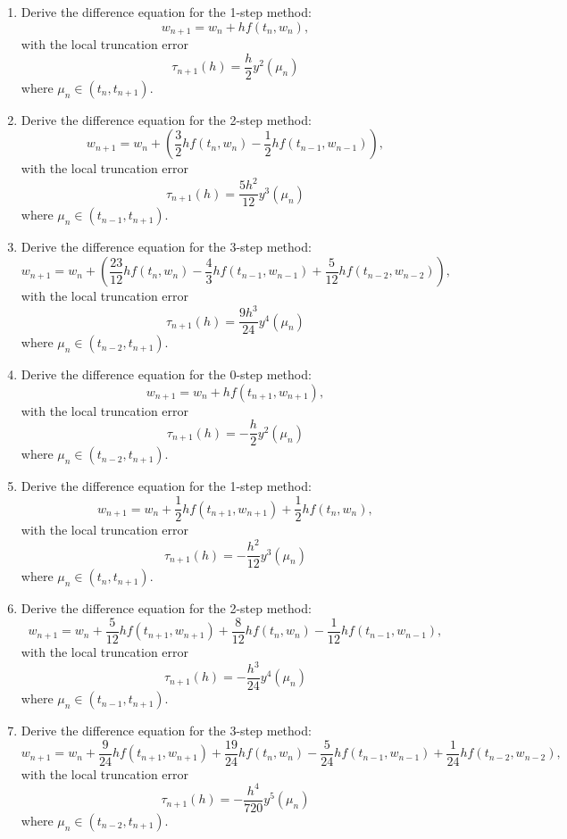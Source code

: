 \begin{enumerate}
\begin{enumerate}
\end{enumerate}
\item
Derive the difference equation for the 1-step  method:\\
\[ w_{n+1}=w_n+hf(t_{n},w_{n}),\]
with the local truncation error
\[ \tau_{n+1}(h)=\frac{h}{2}y^{2}(\mu_n)\]
where $\mu_n \in (t_{n},t_{n+1})$.
\item
Derive the difference equation for the 2-step  method:\\
\[ w_{n+1}=w_n+(\frac{3}{2}hf(t_{n},w_{n})-\frac{1}{2}hf(t_{n-1},w_{n-1})),\]
with the local truncation error
\[ \tau_{n+1}(h)=\frac{5h^2}{12}y^{3}(\mu_n)\]
where $\mu_n \in (t_{n-1},t_{n+1})$.
\item
Derive the difference equation for the 3-step  method:\\
\[ w_{n+1}=w_n+(\frac{23}{12}hf(t_{n},w_{n})-\frac{4}{3}hf(t_{n-1},w_{n-1})+\frac{5}{12}hf(t_{n-2},w_{n-2})),\]
with the local truncation error
\[ \tau_{n+1}(h)=\frac{9h^3}{24}y^{4}(\mu_n)\]
where $\mu_n \in (t_{n-2},t_{n+1})$.
\item
Derive the difference equation for the 0-step  method:\\
\[ w_{n+1}=w_n+hf(t_{n+1},w_{n+1}),\]
with the local truncation error
\[ \tau_{n+1}(h)=-\frac{h}{2}y^{2}(\mu_n)\]
where $\mu_n \in (t_{n-2},t_{n+1})$.
\item
Derive the difference equation for the 1-step  method:\\
\[ w_{n+1}=w_n+\frac{1}{2}hf(t_{n+1},w_{n+1})+\frac{1}{2}hf(t_{n},w_{n}),\]
with the local truncation error
\[ \tau_{n+1}(h)=-\frac{h^2}{12}y^{3}(\mu_n)\]
where $\mu_n \in (t_{n},t_{n+1})$.
\item
Derive the difference equation for the 2-step  method:\\
\[ w_{n+1}=w_n+\frac{5}{12}hf(t_{n+1},w_{n+1})+\frac{8}{12}hf(t_{n},w_{n})-\frac{1}{12}hf(t_{n-1},w_{n-1}),\]
with the local truncation error
\[ \tau_{n+1}(h)=-\frac{h^3}{24}y^{4}(\mu_n)\]
where $\mu_n \in (t_{n-1},t_{n+1})$.
\item
Derive the difference equation for the 3-step  method:\\
\[ w_{n+1}=w_n+\frac{9}{24}hf(t_{n+1},w_{n+1})+\frac{19}{24}hf(t_{n},w_{n})-\frac{5}{24}hf(t_{n-1},w_{n-1})+\frac{1}{24}hf(t_{n-2},w_{n-2}),\]
with the local truncation error
\[ \tau_{n+1}(h)=-\frac{h^4}{720}y^{5}(\mu_n)\]
where $\mu_n \in (t_{n-2},t_{n+1})$.


\end{enumerate}
\newpage